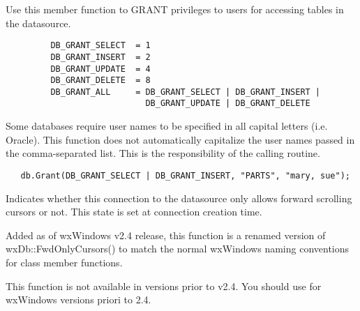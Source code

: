 \label{wxdbgrant}


Use this member function to GRANT privileges to users for accessing tables in the datasource.


\begin{verbatim}
         DB_GRANT_SELECT  = 1
         DB_GRANT_INSERT  = 2
         DB_GRANT_UPDATE  = 4
         DB_GRANT_DELETE  = 8
         DB_GRANT_ALL     = DB_GRANT_SELECT | DB_GRANT_INSERT |
                            DB_GRANT_UPDATE | DB_GRANT_DELETE
\end{verbatim}


Some databases require user names to be specified in all capital letters (i.e. Oracle).  This function does not automatically capitalize the user names passed in the comma-separated list.  This is the responsibility of the calling routine.

\begin{verbatim}
   db.Grant(DB_GRANT_SELECT | DB_GRANT_INSERT, "PARTS", "mary, sue");
\end{verbatim}


\label{wxdbisfwdonlycursors}


Indicates whether this connection to the datasource only allows forward scrolling cursors or not.  This state is set at connection creation time.


Added as of wxWindows v2.4 release, this function is a renamed version of wxDb::FwdOnlyCursors() to match the normal wxWindows naming conventions for class member functions.

This function is not available in versions prior to v2.4.  You should use  for wxWindows versions priori to 2.4.

